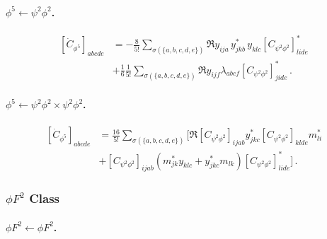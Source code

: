 \paragraph{\texorpdfstring{$\phi^5\leftarrow \psi^2\phi^2$}{phi5frompsi2phi2}.}

\begin{align}
    \left[\dot{C}_{\phi^5}\right]_{abcde} &= - \frac{8}{5!}\sum_{\sigma(\{a,b,c,d,e\})} \Re{y_{ija}\, y_{jkb}^*\, y_{klc}\left[C_{\psi^2\phi^2}\right]_{lide}^*}\nonumber\\
    & +\frac{1}{6}\frac{1}{5!}\sum_{\sigma(\{a,b,c,d,e\})} \Re{y_{ijf}\lambda_{abcf}\left[C_{\psi^2\phi^2}\right]_{jide}^*}\,.\label{phi5_psi2phi2}
\end{align}

\paragraph{\texorpdfstring{$\phi^5\leftarrow \psi^2\phi^2\times\psi^2\phi^2$}{phi5frompsi2phi2xpsi2phi2}.}

\begin{align}
    \left[\dot C_{\phi^5}\right]_{abcde} &= \frac{16}{5!} \sum_{\sigma(\{a,b,c,d,e\})}\Bigg[\Re{\left[C_{\psi^2\phi^2}\right]_{ijab} y^*_{jkc} \left[C_{\psi^2\phi^2}\right]_{klde} m^*_{li}} \nonumber \\ 
     &+ \left[C_{\psi^2\phi^2}\right]_{ijab}\left(m^*_{jk} y_{klc} + y_{jkc}^* m_{lk}\right) \left[C_{\psi^2\phi^2}\right]^*_{lide}\Bigg]\,.\label{phi5_psi2phi2xpsi2phi2}
\end{align}


\subsubsection{\texorpdfstring{$\phi F^2$}{phiF2} Class}


\paragraph{\texorpdfstring{$\phi F^2 \leftarrow \phi F^2$}{phiF2fromphiF2}.}
\label{par:phiF2<-phiF2}

